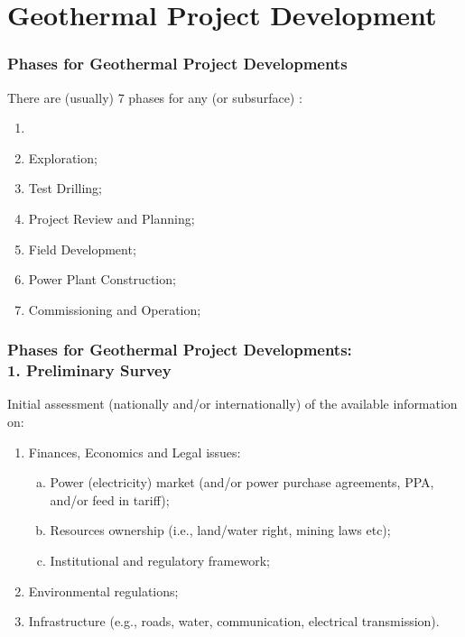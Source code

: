 \documentclass[10pt,compress,unknownkeysallowed]{beamer}
\begin{document}


 \section{Geothermal Project Development} %

\begin{frame}
 \frametitle{Phases for Geothermal Project Developments} 
    There are (usually) 7 phases for any  (or subsurface) : 
    \begin{enumerate}[1.]
       \item <1-> 
       \item <1-> Exploration; 
       \item <1-> Test Drilling;
       \item <1-> Project Review and Planning;
       \item <1-> Field Development; 
       \item <1-> Power Plant Construction;
       \item <1-> Commissioning and Operation;
    \end{enumerate}
\end{frame}

\begin{frame}
 \frametitle{Phases for Geothermal Project Developments: \\1. Preliminary Survey} 

    Initial assessment (nationally and/or internationally) of the available information on:
    \begin{enumerate}[{1.}1]
       \item <1-> Finances, Economics and Legal issues:
          \begin{enumerate}[(a)]
             \item<2-> Power (electricity) market (and/or power purchase agreements, PPA, and/or feed in tariff);
             \item<2-> Resources ownership (i.e., land/water right, mining laws etc);
             \item<2-> Institutional and regulatory framework;
          \end{enumerate}
       \item <3-> Environmental regulations; 
       \item <4-> Infrastructure (e.g., roads, water, communication, electrical transmission).
    \end{enumerate}
\end{frame}
\end{document}
